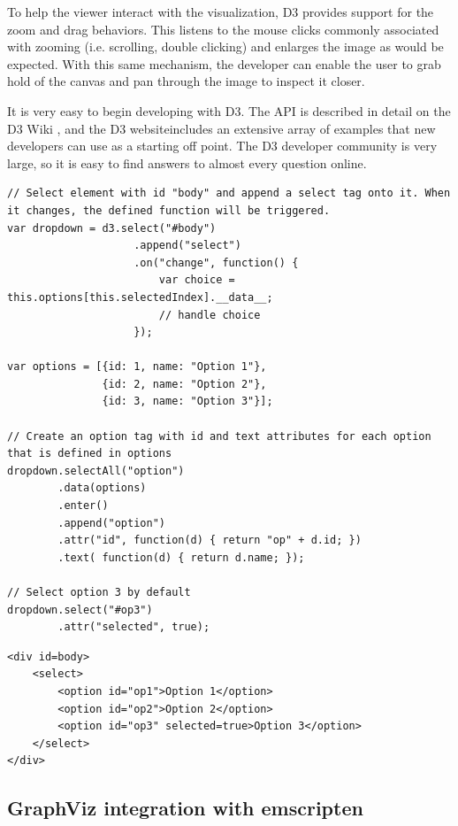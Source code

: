To help the viewer interact with the visualization, D3 provides support for the zoom and drag behaviors. This listens to the mouse clicks commonly associated with zooming (i.e. scrolling, double clicking) and enlarges the image as would be expected. With this same mechanism, the developer can enable the user to grab hold of the canvas and pan through the image to inspect it closer.

It is very easy to begin developing with D3. The API is described in detail on the D3 Wiki \cite{D3Wiki}, and the D3 website\footnotemark[3] includes an extensive array of examples that new developers can use as a starting off point. The D3 developer community is very large, so it is easy to find answers to almost every question online. 

\lstset{language=Java}
\begin{lstlisting}[caption=Dynamically create a dropdown menu.,label=d3Example]
// Select element with id "body" and append a select tag onto it. When it changes, the defined function will be triggered.
var dropdown = d3.select("#body")
				   	.append("select")
				   	.on("change", function() {
				   		var choice = this.options[this.selectedIndex].__data__;
				   		// handle choice
				   	});

var options = [{id: 1, name: "Option 1"},
			   {id: 2, name: "Option 2"},
			   {id: 3, name: "Option 3"}];

// Create an option tag with id and text attributes for each option that is defined in options
dropdown.selectAll("option")
		.data(options)
		.enter()
		.append("option")
		.attr("id", function(d) { return "op" + d.id; })
		.text( function(d) { return d.name; });

// Select option 3 by default
dropdown.select("#op3")
		.attr("selected", true);
\end{lstlisting} 

\lstset{language=HTML}
\begin{lstlisting}[caption=Html generated from Listing \ref{d3Example},label=d3Result]
<div id=body>
    <select>
        <option id="op1">Option 1</option>
        <option id="op2">Option 2</option>
        <option id="op3" selected=true>Option 3</option>
    </select>
</div>
\end{lstlisting}


\subsection{GraphViz integration with emscripten}

